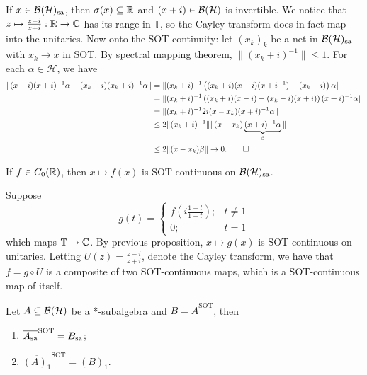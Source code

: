 \begin{myproof}
  If $x \in \mathcal{B}(\mathcal{H})_{\operatorname{sa}}$, then $\sigma(x) \subseteq \mathbb {R}$ and $(x + i) \in \operatorname{\mathcal{B} (\mathcal{H})}$ is invertible.
  We notice that $z \mapsto \frac{z - i}{z + i}: \mathbb {R} \to \mathbb {C}$ has its range in $\mathbb{T}$,
  so the Cayley transform does in fact map into the unitaries. Now onto the SOT-continuity:
  let $(x_k)_k$ be a net in $\mathcal{B}(\mathcal{H})_{\operatorname{sa}}$ with $x_k \to x$ in SOT.
  By spectral mapping theorem, $\| (x_k + i)^{-1} \| \leq 1.$ For each $\alpha \in \mathcal{H}$,
  we have
  \begin{align*}
    \|(x - i) (x + i)^{-1} \alpha - (x_k - i)(x_k + i)^{-1} \alpha\| &= \| (x_k + i)^{-1} \left((x_k + i) (x - i) (x + i^{-1}) - (x_k - i)\right) \alpha \|\\
    &= \| (x_k + i)^{-1} \left((x_k + i) (x - i) - (x_k - i)(x + i)\right) (x + i)^{-1} \alpha \|\\
    &= \| (x_k + i)^{-1} 2i (x - x_k) (x + i)^{-1} \alpha\|\\
    &\leq 2 \|(x_k + i)^{-1}\| \|(x - x_k)\underbrace{(x + i)^{-1} \alpha}_{\beta}\|\\
    &\leq 2\| (x - x_k) \beta\| \to 0. \qedhere
  \end{align*}
\end{myproof}

\begin{corollary}
  If $f \in C_0(\mathbb {R})$, then $x \mapsto f(x)$ is SOT-continuous on $\mathcal{B}(\mathcal{H})_{\operatorname{sa}}$.
\end{corollary}

\begin{myproof}
  Suppose 
  $$g(t) = \begin{cases}
    f\left(i \frac{1 + t}{1 - t}\right);& t \neq 1\\
    0;& t = 1
  \end{cases}$$
  which maps $\mathbb{T} \to \mathbb {C}$.
  By previous proposition, $x \mapsto g(x)$ is SOT-continuous on unitaries.
  Letting $U(z) = \frac{z - i}{z + i}$, denote the Cayley transform, we have that 
  $f = g \circ U$ is a composite of two SOT-continuous maps, which is a SOT-continuous map of itself.
\end{myproof}

\begin{theorem}
  Let $A \subseteq \operatorname{\mathcal{B} (\mathcal{H})}$ be a *-subalgebra and $B = \overline{A}^{\mathrm{SOT}}$,
  then \begin{enumerate}
    \item $\overline{A_{\operatorname{sa}}}^{\mathrm{SOT}} = B_{\operatorname{sa}}$;
    \item $\overline{(A)_1}^{\mathrm{SOT}} = (B)_1$.
  \end{enumerate}
\end{theorem}

